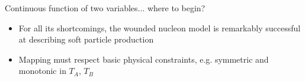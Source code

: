 \documentclass[svgnames]{beamer}
\begin{document}
\begin{frame}[t]{Continuous function of two variables... where to begin?}
 \vspace{0.1 in}
 \begin{itemize}
  \item For all its shortcomings, the wounded nucleon model is remarkably successful at describing soft particle production
  \item Mapping must respect basic physical constraints, e.g. symmetric and monotonic in $T_A$, $T_B$
 \end{itemize}
 \vspace{0.1 in}
 \vspace{0.1 in}
 \begin{columns}
  \begin{column}{0.33\textwidth}
  \end{column}
  \begin{column}{0.33\textwidth}

\end{column}
\end{columns}
\end{frame}
\end{document}

